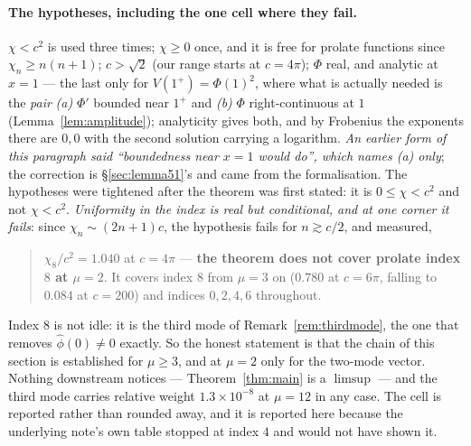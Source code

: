 \documentclass[11pt,a4paper]{article}
\theoremstyle{plain}
\theoremstyle{definition}
\theoremstyle{remark}
\begin{document}
\paragraph{The hypotheses, including the one cell where they fail.}  $\chi<c^2$
is used three times; $\chi\ge0$ once, and it is free for prolate functions since
$\chi_n\ge n(n+1)$; $c>\sqrt2$ (our range starts at $c=4\pi$); $\Phi$ real, and
analytic at $x=1$ --- the last only for $V(1^+)=\Phi(1)^2$, where what is
actually needed is the \emph{pair} \emph{(a)} $\Phi'$ bounded near $1^+$ and
\emph{(b)} $\Phi$ right-continuous at $1$ (Lemma~\ref{lem:amplitude});
analyticity gives both, and by Frobenius the exponents there are $0,0$ with the
second solution carrying a logarithm.  \emph{An earlier form of this paragraph
said ``boundedness near $x=1$ would do'', which names (a) only}; the correction
is \S\ref{sec:lemma51}'s and came from the formalisation.  The hypotheses were
tightened after the theorem
was first stated: it is $0\le\chi<c^2$ and not $\chi<c^2$.
\emph{Uniformity in the index is real but conditional, and at one corner it
fails}: since $\chi_n\sim(2n+1)c$, the hypothesis fails for $n\gtrsim c/2$, and
measured,
\begin{quote}
$\chi_8/c^2=1.040$ at $c=4\pi$ --- \textbf{the theorem does not cover prolate
index $8$ at $\mu=2$}.  It covers index $8$ from $\mu=3$ on ($0.780$ at $c=6\pi$,
falling to $0.084$ at $c=200$) and indices $0,2,4,6$ throughout.
\end{quote}
\noindent Index $8$ is not idle: it is the third mode of
Remark~\ref{rem:thirdmode}, the one that removes $\widehat\phi(0)\ne0$ exactly.
So the honest statement is that the chain of this section is established for
$\mu\ge3$, and at $\mu=2$ only for the two-mode vector.  Nothing downstream
notices --- Theorem~\ref{thm:main} is a $\limsup$ --- and the third mode carries
relative weight $1.3\times10^{-8}$ at $\mu=12$ in any case.  The cell is
reported rather than rounded away, and it is reported here because the
underlying note's own table stopped at index $4$ and would not have shown it.
\end{document}
